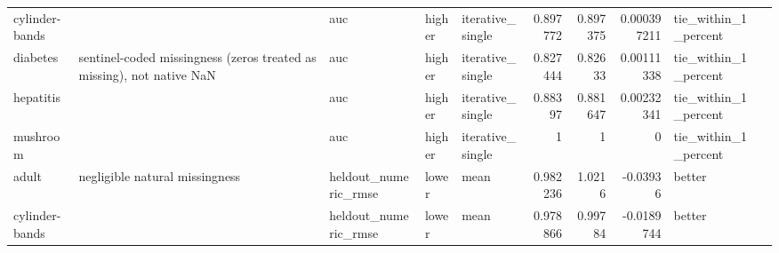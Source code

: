 \begin{table}[ht]
{\begin{tabular}{lllllrrrll}
 cylinder-bands &                                                                       & auc                            & higher             & iterative\_single &                   0.897772 &               0.897375 &                     0.000397211 & tie\_within\_1\_percent &                                                                                                                    \\
 diabetes       & sentinel-coded missingness (zeros treated as missing), not native NaN & auc                            & higher             & iterative\_single &                   0.827444 &               0.82633  &                     0.00111338  & tie\_within\_1\_percent &                                                                                                                    \\
 hepatitis      &                                                                       & auc                            & higher             & iterative\_single &                   0.88397  &               0.881647 &                     0.00232341  & tie\_within\_1\_percent &                                                                                                                    \\
 mushroom       &                                                                       & auc                            & higher             & iterative\_single &                   1        &               1        &                     0           & tie\_within\_1\_percent &                                                                                                                    \\
 adult          & negligible natural missingness                                        & heldout\_numeric\_rmse           & lower              & mean             &                   0.982236 &               1.0216   &                    -0.03936     & better               &                                                                                                                    \\
 cylinder-bands &                                                                       & heldout\_numeric\_rmse           & lower              & mean             &                   0.978866 &               0.99784  &                    -0.0189744   & better               &                                                                                                                    \\

\end{tabular}}
\end{table}
